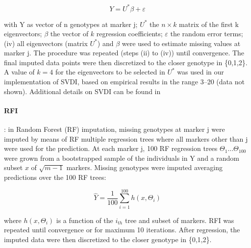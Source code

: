 \begin{equation}
\label{eq:SVDI_regression}
Y = U^*\beta +\varepsilon 
\end{equation}

with Y as vector of n genotypes at marker j; $U^*$ the $n \times k$ matrix of the first k eigenvectors; $\beta$ the vector of $k$ regression coefficients; $\varepsilon$ the random error terms; (iv) all eigenvectors (matrix $U^*$) and $\beta$ were used to estimate missing values at marker j. The procedure was repeated (steps (ii) to (iv)) until convergence. The final imputed data points were then discretized to the closer genotype in \{0,1,2\}. A value of $k=4$ for the eigenvectors to be selected in $U^*$ was used in our implementation of SVDI, based on empirical results in the range 3--20 (data not shown). Additional details on SVDI can be found in \cite{troyanskaya_missing_2001}

\paragraph{RFI}
\label{par:RFI}
: in Random Forest (RF) imputation, missing genotypes at marker j were imputed by means of RF multiple regression trees \cite{breiman_random_2001} where all markers other than j were used for the prediction. At each marker j, 100 RF regression trees $\Theta_{1} \ldots \Theta_{100}$ were grown from a bootstrapped sample of the individuals in Y and a random subset $x$ of $\sqrt{m-1}$ markers. Missing genotypes were imputed averaging predictions over the 100 RF trees:

\begin{equation}
\label{eq:RFI_regression}
\hat{Y} = \frac{1}{100}\sum_{i=1}^{100} h(x,\Theta_i)
\end{equation}

where $h(x,\Theta_i)$ is a function of the $i_{th}$ tree and subset of markers. RFI was repeated until convergence or for maximum 10 iterations. After regression, the imputed data were then discretized to the closer genotype in \{0,1,2\}. 

